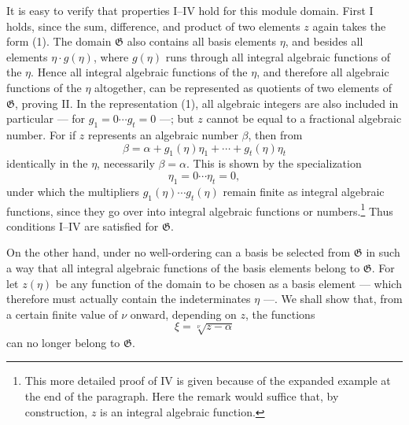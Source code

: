 \documentclass[11pt]{article}
\begin{document}
It is easy to verify that properties I--IV hold for this module domain. First I
holds, since the sum, difference, and product of two elements $z$ again takes the
form (1). The domain $\mathfrak G$ also contains all basis elements $\eta$, and
besides all elements $\eta\cdot g(\eta)$, where $g(\eta)$ runs through all
integral algebraic functions of the $\eta$. Hence all integral algebraic functions
of the $\eta$, and therefore all algebraic functions of the $\eta$ altogether,
can be represented as quotients of two elements of $\mathfrak G$, proving II.
In the representation (1), all algebraic integers are also included in particular
--- for $g_1=0\cdots g_t=0$ ---; but $z$ cannot be equal to a fractional
algebraic number. For if $z$ represents an algebraic number $\beta$, then from
\[
 \beta=\alpha+g_1(\eta)\eta_1+\cdots+g_t(\eta)\eta_t
\]
identically in the $\eta$, necessarily $\beta=\alpha$. This is shown by the
specialization
\[
 \eta_1=0\cdots \eta_t=0,
\]
under which the multipliers $g_1(\eta)\cdots g_t(\eta)$ remain finite as integral
algebraic functions, since they go over into integral algebraic functions or
numbers.\footnote{This more detailed proof of IV is given because of the expanded
example at the end of the paragraph. Here the remark would suffice that, by
construction, $z$ is an integral algebraic function.} Thus conditions I--IV are
satisfied for $\mathfrak G$.

On the other hand, under no well-ordering can a basis be selected from
$\mathfrak G$ in such a way that all integral algebraic functions of the basis
elements belong to $\mathfrak G$. For let $z(\eta)$ be any function of the domain
to be chosen as a basis element --- which therefore must actually contain the
indeterminates $\eta$ ---. We shall show that, from a certain finite value of
$\nu$ onward, depending on $z$, the functions
\[
 \xi=\sqrt[\nu]{z-\alpha}
\]
can no longer belong to $\mathfrak G$.
\end{document}
